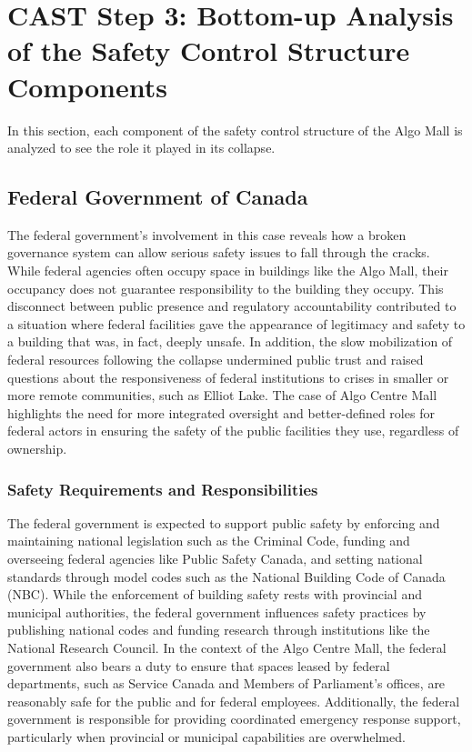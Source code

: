 \documentclass[12pt]{article}
\begin{document}
\section{CAST Step 3: Bottom-up Analysis of the Safety Control Structure Components}

In this section, each component of the safety control structure of the Algo Mall is analyzed to see the role it played in its collapse.

\subsection{Federal Government of Canada}

The federal government's involvement in this case reveals how a broken governance system can allow serious safety issues to fall through the cracks. While federal agencies often occupy space in buildings like the Algo Mall, their occupancy does not guarantee responsibility to the building they occupy. This disconnect between public presence and regulatory accountability contributed to a situation where federal facilities gave the appearance of legitimacy and safety to a building that was, in fact, deeply unsafe. In addition, the slow mobilization of federal resources following the collapse undermined public trust and raised questions about the responsiveness of federal institutions to crises in smaller or more remote communities, such as Elliot Lake. The case of Algo Centre Mall highlights the need for more integrated oversight and better-defined roles for federal actors in ensuring the safety of the public facilities they use, regardless of ownership.

\subsubsection*{Safety Requirements and Responsibilities}

The federal government is expected to support public safety by enforcing and maintaining national legislation such as the Criminal Code, funding and overseeing federal agencies like Public Safety Canada, and setting national standards through model codes such as the National Building Code of Canada (NBC). While the enforcement of building safety rests with provincial and municipal authorities, the federal government influences safety practices by publishing national codes and funding research through institutions like the National Research Council. In the context of the Algo Centre Mall, the federal government also bears a duty to ensure that spaces leased by federal departments, such as Service Canada and Members of Parliament's offices, are reasonably safe for the public and for federal employees. Additionally, the federal government is responsible for providing coordinated emergency response support, particularly when provincial or municipal capabilities are overwhelmed.
\end{document}
